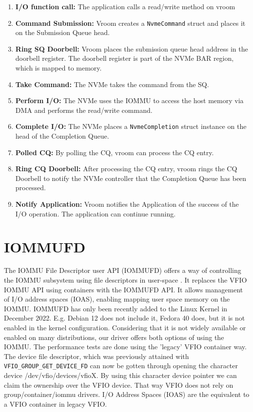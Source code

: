 \begin{enumerate}
    \item \textbf{I/O function call:} The application calls a read/write method on vroom
    \item \textbf{Command Submission:} Vroom creates a \texttt{NvmeCommand} struct and places it on the Submission Queue head.
    \item \textbf{Ring SQ Doorbell:} Vroom places the submission queue head address in the doorbell register. The doorbell register is part of the NVMe BAR region, which is mapped to memory.
    \item \textbf{Take Command:} The NVMe takes the command from the SQ.
    \item \textbf{Perform I/O:} The NVMe uses the IOMMU to access the host memory via DMA and performs the read/write command.
    \item \textbf{Complete I/O:} The NVMe places a \texttt{NvmeCompletion} struct instance on the head of the Completion Queue.
    \item \textbf{Polled CQ:} By polling the CQ, vroom can process the CQ entry.
    \item \textbf{Ring CQ Doorbell:} After processing the CQ entry, vroom rings the CQ Doorbell to notify the NVMe controller that the Completion Queue has been processed.
    \item \textbf{Notify Application:} Vroom notifies the Application of the success of the I/O operation. The application can continue running.
\end{enumerate}

\section{IOMMUFD}
The IOMMU File Descriptor user API (IOMMUFD) offers a way of controlling the IOMMU subsystem using file descriptors in user-space \cite{iommufdkerneldocs}. It replaces the VFIO IOMMU API using containers with the IOMMUFD API.
It allows management of I/O address spaces (IOAS), enabling mapping user space memory on the IOMMU.
IOMMUFD has only been recently added to the Linux Kernel in December 2022. E.g. Debian 12 does not include it, Fedora 40 does, but it is not enabled in the kernel configuration. Considering that it is not widely available or enabled on many distributions, our driver offers both options of using the IOMMU. The performance tests are done using the 'legacy' VFIO container way.
The device file descriptor, which was previously attained with \texttt{VFIO\_GROUP\_GET\_DEVICE\_FD} can now be gotten through opening the character device /dev/vfio/devices/vfioX.
By using this character device pointer we can claim the ownership over the VFIO device. That way VFIO does not rely on group/container/iommu drivers.
I/O Address Spaces (IOAS) are the equivalent to a VFIO container in legacy VFIO.

